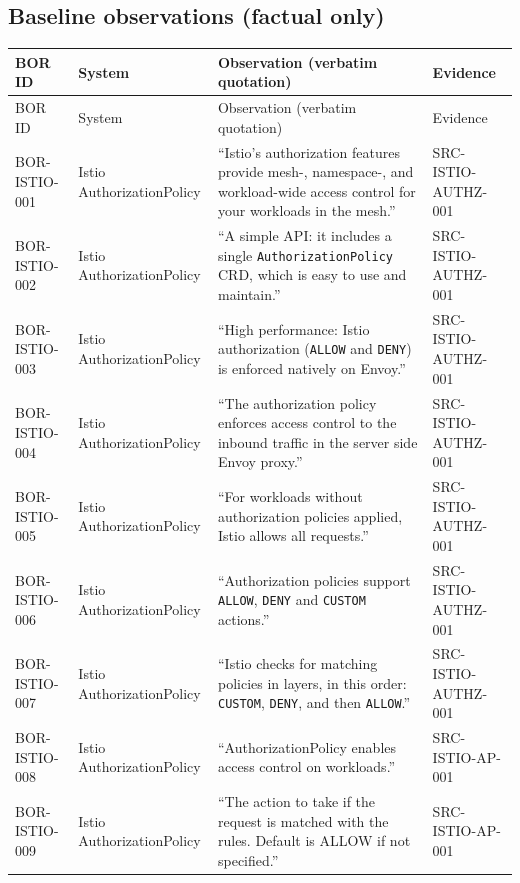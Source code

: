 \documentclass{article}
\begin{document}
\subsection*{Baseline observations (factual only)}
\begin{longtable}{@{}p{}p{}p{}p{}@{}}
\toprule
BOR ID & System & Observation (verbatim quotation) & Evidence\\
\midrule
\endfirsthead
\toprule
BOR ID & System & Observation (verbatim quotation) & Evidence\\
\midrule
\endhead
BOR-ISTIO-001 & Istio AuthorizationPolicy & ``Istio’s authorization features provide mesh-, namespace-, and workload-wide access control for your workloads in the mesh.'' & SRC-ISTIO-AUTHZ-001\\
BOR-ISTIO-002 & Istio AuthorizationPolicy & ``A simple API: it includes a single \texttt{AuthorizationPolicy} CRD, which is easy to use and maintain.'' & SRC-ISTIO-AUTHZ-001\\
BOR-ISTIO-003 & Istio AuthorizationPolicy & ``High performance: Istio authorization (\texttt{ALLOW} and \texttt{DENY}) is enforced natively on Envoy.'' & SRC-ISTIO-AUTHZ-001\\
BOR-ISTIO-004 & Istio AuthorizationPolicy & ``The authorization policy enforces access control to the inbound traffic in the server side Envoy proxy.'' & SRC-ISTIO-AUTHZ-001\\
BOR-ISTIO-005 & Istio AuthorizationPolicy & ``For workloads without authorization policies applied, Istio allows all requests.'' & SRC-ISTIO-AUTHZ-001\\
BOR-ISTIO-006 & Istio AuthorizationPolicy & ``Authorization policies support \texttt{ALLOW}, \texttt{DENY} and \texttt{CUSTOM} actions.'' & SRC-ISTIO-AUTHZ-001\\
BOR-ISTIO-007 & Istio AuthorizationPolicy & ``Istio checks for matching policies in layers, in this order: \texttt{CUSTOM}, \texttt{DENY}, and then \texttt{ALLOW}.'' & SRC-ISTIO-AUTHZ-001\\
BOR-ISTIO-008 & Istio AuthorizationPolicy & ``AuthorizationPolicy enables access control on workloads.'' & SRC-ISTIO-AP-001\\
BOR-ISTIO-009 & Istio AuthorizationPolicy & ``The action to take if the request is matched with the rules. Default is ALLOW if not specified.'' & SRC-ISTIO-AP-001\\
\bottomrule
\end{longtable}
\end{document}
